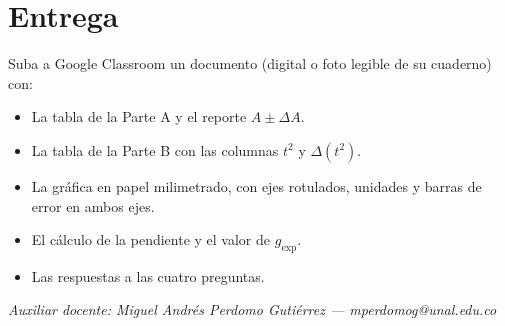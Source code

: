 \documentclass[11pt, letterpaper]{article}
\begin{document}
	\section{Entrega}
	
	Suba a Google Classroom un documento (digital o foto legible de su cuaderno) con:
	
	\begin{itemize}
		\item La tabla de la Parte A y el reporte $A \pm \Delta A$.
		\item La tabla de la Parte B con las columnas $t^{2}$ y $\Delta(t^{2})$.
		\item La gráfica en papel milimetrado, con ejes rotulados, unidades y barras
		de error en ambos ejes.
		\item El cálculo de la pendiente y el valor de $g_{\text{exp}}$.
		\item Las respuestas a las cuatro preguntas.
	\end{itemize}
	
	\vfill
	\noindent
	{\footnotesize \textit{Auxiliar docente: Miguel Andrés Perdomo Gutiérrez ---
			mperdomog@unal.edu.co}}
	
\end{document}
